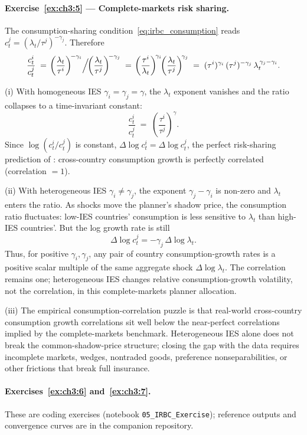 \documentclass[11pt,a4paper]{report}
\begin{document}
\paragraph{Exercise~\ref{ex:ch3:5} --- Complete-markets risk sharing.}
The consumption-sharing condition~\eqref{eq:irbc_consumption} reads $c_t^j = (\lambda_t/\tau^j)^{-\gamma_j}$.  Therefore
\[
   \frac{c_t^i}{c_t^j} \;=\; \!\left(\frac{\lambda_t}{\tau^i}\right)^{\!-\gamma_i}\!\Bigl/\!\left(\frac{\lambda_t}{\tau^j}\right)^{\!-\gamma_j}
   \;=\;
   \!\left(\frac{\tau^i}{\lambda_t}\right)^{\!\gamma_i}\!\!\left(\frac{\lambda_t}{\tau^j}\right)^{\!\gamma_j}
   \;=\;
   (\tau^i)^{\gamma_i}\,(\tau^j)^{-\gamma_j}\,\lambda_t^{\,\gamma_j - \gamma_i}.
\]

(i) With homogeneous IES $\gamma_i = \gamma_j = \gamma$, the $\lambda_t$ exponent vanishes and the ratio collapses to a time-invariant constant:
\[
   \frac{c_t^i}{c_t^j} \;=\; \!\left(\frac{\tau^i}{\tau^j}\right)^{\!\gamma}.
\]
Since $\log(c_t^i/c_t^j)$ is constant, $\Delta\log c_t^i = \Delta\log c_t^j$, the perfect risk-sharing prediction of \citet{backus1992international}: cross-country consumption growth is perfectly correlated (correlation $= 1$).

(ii) With heterogeneous IES $\gamma_i \neq \gamma_j$, the exponent $\gamma_j - \gamma_i$ is non-zero and $\lambda_t$ enters the ratio.  As shocks move the planner's shadow price, the consumption ratio fluctuates: low-IES countries' consumption is less sensitive to $\lambda_t$ than high-IES countries'.  But the log growth rate is still
\[
   \Delta \log c_t^j = -\gamma_j\,\Delta\log\lambda_t .
\]
Thus, for positive $\gamma_i,\gamma_j$, any pair of country consumption-growth rates is a positive scalar multiple of the same aggregate shock $\Delta\log\lambda_t$.  The correlation remains one; heterogeneous IES changes relative consumption-growth volatility, not the correlation, in this complete-markets planner allocation.

(iii) The empirical consumption-correlation puzzle is that real-world cross-country consumption growth correlations sit well below the near-perfect correlations implied by the complete-markets benchmark.  Heterogeneous IES alone does not break the common-shadow-price structure; closing the gap with the data requires incomplete markets, wedges, nontraded goods, preference nonseparabilities, or other frictions that break full insurance.

\paragraph{Exercises~\ref{ex:ch3:6} and~\ref{ex:ch3:7}.}
These are coding exercises (notebook \texttt{05\_IRBC\_Exercise}); reference outputs and convergence curves are in the companion repository.
\end{document}
